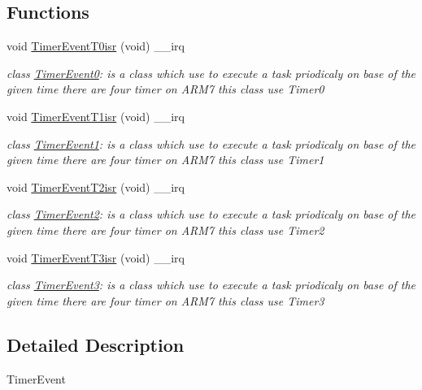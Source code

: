 \subsection*{Functions}
\begin{DoxyCompactItemize}
\item 
void \hyperlink{group__group1_gaf2959b56b8262958baffd70506d05dd8}{TimerEventT0isr} (void) \_\-\_\-irq
\begin{DoxyCompactList}\small\item\em class \hyperlink{class_timer_event0}{TimerEvent0}: is a class which use to execute a task priodicaly on base of the given time there are four timer on ARM7 this class use Timer0 \end{DoxyCompactList}\item 
void \hyperlink{group__group1_gac7c5fb29ebc9cc65160fb137b050ca36}{TimerEventT1isr} (void) \_\-\_\-irq
\begin{DoxyCompactList}\small\item\em class \hyperlink{class_timer_event1}{TimerEvent1}: is a class which use to execute a task priodicaly on base of the given time there are four timer on ARM7 this class use Timer1 \end{DoxyCompactList}\item 
void \hyperlink{group__group1_ga9d898d3f90a197739fa7fe126e0e31a0}{TimerEventT2isr} (void) \_\-\_\-irq
\begin{DoxyCompactList}\small\item\em class \hyperlink{class_timer_event2}{TimerEvent2}: is a class which use to execute a task priodicaly on base of the given time there are four timer on ARM7 this class use Timer2 \end{DoxyCompactList}\item 
void \hyperlink{group__group1_ga9edf9eb7d62d6efcec64bca24b601203}{TimerEventT3isr} (void) \_\-\_\-irq
\begin{DoxyCompactList}\small\item\em class \hyperlink{class_timer_event3}{TimerEvent3}: is a class which use to execute a task priodicaly on base of the given time there are four timer on ARM7 this class use Timer3 \end{DoxyCompactList}\end{DoxyCompactItemize}


\subsection{Detailed Description}
TimerEvent 

